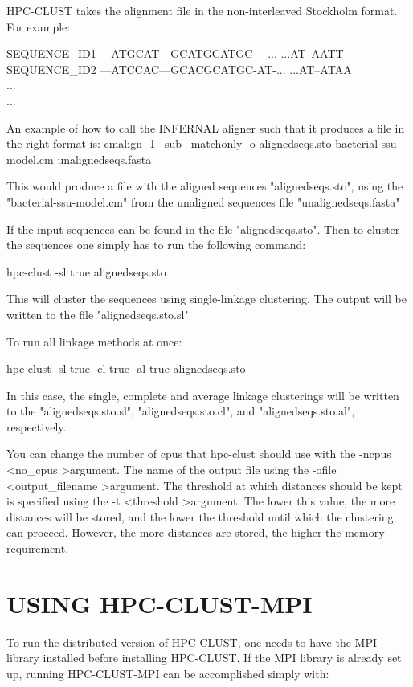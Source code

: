 \documentclass[10pt,a4paper]{article}
\begin{document}
HPC-CLUST takes the alignment file in the non-interleaved Stockholm format. For example:

SEQUENCE\_ID1      ---ATGCAT---GCATGCATGC----... ...AT--AATT\\
SEQUENCE\_ID2      ---ATCCAC---GCACGCATGC-AT-... ...AT--ATAA\\
...\\
...


An example of how to call the INFERNAL aligner such that it produces a file in the
right format is:
cmalign -1 --sub --matchonly -o alignedseqs.sto bacterial-ssu-model.cm unalignedseqs.fasta

This would produce a file with the aligned sequences "alignedseqs.sto", using the
"bacterial-ssu-model.cm" from the unaligned sequences file "unalignedseqs.fasta"

If the input sequences can be found in the file "alignedseqs.sto". Then to cluster the
sequences one simply has to run the following command:

hpc-clust -sl true alignedseqs.sto

This will cluster the sequences using single-linkage clustering. The output will be written
to the file "alignedseqs.sto.sl"

To run all linkage methods at once:

hpc-clust -sl true -cl true -al true alignedseqs.sto

In this case, the single, complete and average linkage clusterings will be written to the
"alignedseqs.sto.sl", "alignedseqs.sto.cl", and "alignedseqs.sto.al", respectively.

You can change the number of cpus that hpc-clust should use with the -ncpus \textless no\_cpus \textgreater argument.
The name of the output file using the -ofile \textless output\_filename \textgreater argument.
The threshold at which distances should be kept is specified using the -t \textless threshold \textgreater argument.
The lower this value, the more distances will be stored, and the lower the threshold until which
the clustering can proceed. However, the more distances are stored, the higher the memory 
requirement.



\section{USING HPC-CLUST-MPI}

To run the distributed version of HPC-CLUST, one needs to have the MPI library installed
before installing HPC-CLUST. If the MPI library is already set up, running HPC-CLUST-MPI
can be accomplished simply with:
\end{document}
